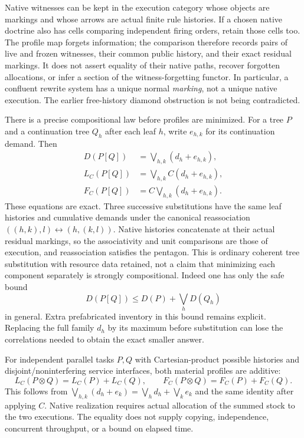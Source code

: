 \documentclass[11pt]{article}
\theoremstyle{definition}
\theoremstyle{remark}
\begin{document}
Native witnesses can be kept in the execution category whose objects are
markings and whose arrows are actual finite rule histories. If a chosen
native doctrine also has cells comparing independent firing orders, retain
those cells too. The profile map forgets information; the comparison
therefore records pairs of live and frozen witnesses, their common public
history, and their exact residual markings. It does not assert equality
of their native paths, recover forgotten allocations, or infer a section
of the witness-forgetting functor. In particular, a confluent rewrite
system has a unique normal \emph{marking}, not a unique native execution.
The earlier free-history diamond obstruction is not being contradicted.

There is a precise compositional law before profiles are minimized.
For a tree $P$ and a continuation tree $Q_h$ after each leaf $h$, write
$e_{h,k}$ for its continuation demand. Then
\[
 \begin{split}
 D(P[Q])&=\bigvee_{h,k}(d_h+e_{h,k}),\\
 L_C(P[Q])&=\bigvee_{h,k}C(d_h+e_{h,k}),\\
 F_C(P[Q])&=C\bigvee_{h,k}(d_h+e_{h,k}).
 \end{split}
\tag{$\ddagger$}
\]
These equations are exact. Three successive substitutions have the same
leaf histories and cumulative demands under the canonical reassociation
$((h,k),l)\leftrightarrow(h,(k,l))$. Native histories concatenate at their
actual residual markings, so the associativity and unit comparisons are
those of execution, and reassociation satisfies the pentagon. This is
ordinary coherent tree substitution with resource data retained, not a
claim that minimizing each component separately is strongly compositional.
Indeed one has only the safe bound
\[
 D(P[Q])\le D(P)+\bigvee_hD(Q_h)
\]
in general. Extra prefabricated inventory in this bound remains explicit.
Replacing the full family $d_h$ by its maximum before substitution can
lose the correlations needed to obtain the exact smaller answer.

For independent parallel tasks $P,Q$ with Cartesian-product possible
histories and disjoint/noninterfering service interfaces, both material
profiles are additive:
\[
 L_C(P\otimes Q)=L_C(P)+L_C(Q),\qquad
 F_C(P\otimes Q)=F_C(P)+F_C(Q).
\]
This follows from $\bigvee_{h,k}(d_h+e_k)=\bigvee_hd_h+\bigvee_ke_k$
and the same identity after applying $C$. Native realization requires
actual allocation of the summed stock to the two executions. The equality
does not supply copying, independence, concurrent throughput, or a bound
on elapsed time.
\end{document}
